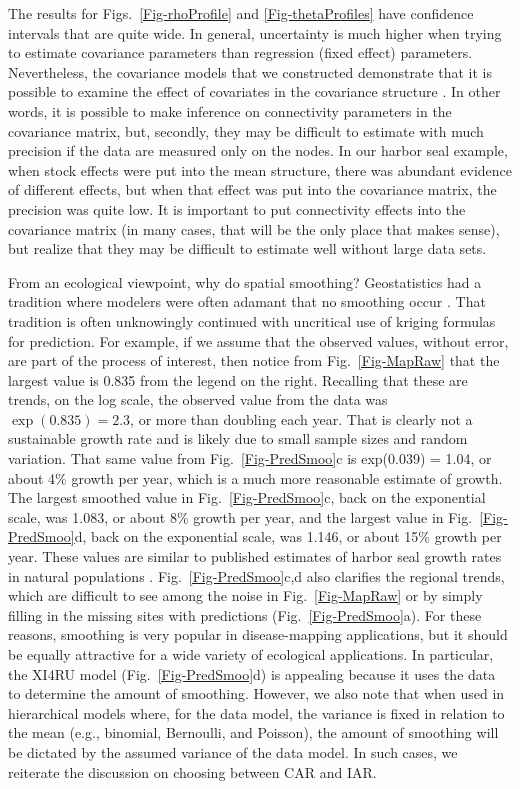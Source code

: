 The results for Figs.~\ref{Fig-rhoProfile} and \ref{Fig-thetaProfiles} have confidence intervals that are quite wide.  In general, uncertainty is much higher when trying to estimate covariance parameters than regression (fixed effect) parameters. Nevertheless, the covariance models that we constructed demonstrate that it is possible to examine the effect of covariates in the covariance structure \citep[see also][]{Hank:Hoot:circ:2013}.  In other words, it is possible to make inference on connectivity parameters in the covariance matrix, but, secondly, they may be difficult to estimate with much precision if the data are measured only on the nodes.  In our harbor seal example, when stock effects were put into the mean structure, there was abundant evidence of different effects, but when that effect was put into the covariance matrix, the precision was quite low.  It is important to put connectivity effects into the covariance matrix (in many cases, that will be the only place that makes sense), but realize that they may be difficult to estimate well without large data sets.

From an ecological viewpoint, why do spatial smoothing?  Geostatistics had a tradition where modelers were often adamant that no smoothing occur \citep[``honoring the data,''][p. 224]{Scha:Gotw:stat:2005}. That tradition is often unknowingly continued with uncritical use of kriging formulas for prediction.  For example, if we assume that the observed values, without error, are part of the process of interest, then notice from Fig.~\ref{Fig-MapRaw} that the largest value is 0.835 from the legend on the right.  Recalling that these are trends, on the log scale, the observed value from the data was $\exp(0.835)=2.3$, or more than doubling each year.  That is clearly not a sustainable growth rate and is likely due to small sample sizes and random variation.  That same value from Fig.~\ref{Fig-PredSmoo}c is exp(0.039) = 1.04, or about 4\% growth per year, which is a much more reasonable estimate of growth.  The largest smoothed value in Fig.~\ref{Fig-PredSmoo}c, back on the exponential scale, was 1.083, or about 8\% growth per year, and the largest value in Fig.~\ref{Fig-PredSmoo}d, back on the exponential scale, was 1.146, or about 15\% growth per year. These values are similar to published estimates of harbor seal growth rates in natural populations \citep[e.g.,][]{Hast:Smal:Pend:sex:2012}.  Fig.~\ref{Fig-PredSmoo}c,d also clarifies the regional trends, which are difficult to see among the noise in Fig.~\ref{Fig-MapRaw} or by simply filling in the missing sites with predictions (Fig.~\ref{Fig-PredSmoo}a).  For these reasons, smoothing is very popular in disease-mapping applications, but it should be equally attractive for a wide variety of ecological applications. In particular, the XI4RU model (Fig.~\ref{Fig-PredSmoo}d) is appealing because it uses the data to determine the amount of smoothing.  However, we also note that when used in hierarchical models where, for the data model, the variance is fixed in relation to the mean (e.g., binomial, Bernoulli, and Poisson), the amount of smoothing will be dictated by the assumed variance of the data model.  In such cases, we reiterate the discussion on choosing between CAR and IAR.


